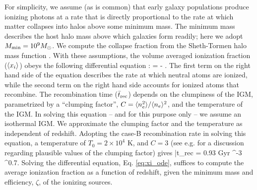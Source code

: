 For simplicity, we assume (as is common) that early galaxy populations produce ionizing photons at a rate
that is directly proportional
to the rate at which matter collapses into halos above some minimum mass. The minimum mass describes the 
host halo mass above which galaxies form readily; here we adopt $M_{\rm min} = 10^9 M_\odot$. We compute the collapse fraction
from the Sheth-Tormen halo mass function \citep{Sheth:1999su}.
With these assumptions, the volume averaged ionization fraction ($\langle x_i \rangle$) obeys the following differential equation \citep{1987ApJ...321L.107S,1999ApJ...514..648M}:
\beqa
{} = \zeta {} - .
\label{eq:xi_ode}
\eeqa
The first term on the right hand side of the equation describes the rate at which neutral atoms are ionized, while the second
term on the right hand side accounts for ionized atoms that recombine. The recombination time ($\bar{t}_{\rm rec}$) depends on the clumpiness of the IGM,
parametrized by a ``clumping factor'', $C=\langle n_e^2 \rangle/\langle n_e \rangle^2$, and the temperature of the IGM. In solving this equation -- and for this purpose only -- we assume an isothermal
IGM. We approximate the clumping factor and the temperature as independent of redshift.
Adopting the case-B recombination rate in solving this equation, a temperature of $T_0 = 2 \times 10^4$ K, and $C=3$ (see e.g. \citealt{Pawlik:2008mr,McQuinn:2011aa} for a discussion regarding plausible values of the clumping factor) gives
\beqa
\bar{t}_{\rm rec} = 0.93 {\rm Gyr}  ^{-3} ^{0.7}.
\label{eq:trec}
\eeqa
Solving the differential equation, Eq. \ref{eq:xi_ode}, suffices to compute the average ionization fraction as a function of redshift, given
the minimum mass and efficiency, $\zeta$, of the ionizing sources.

